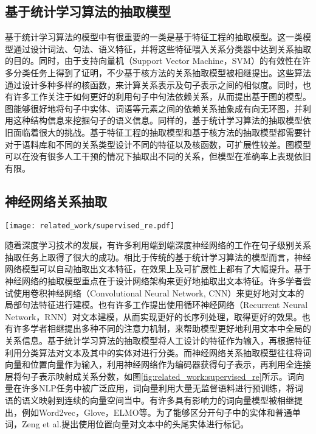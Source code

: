 \subsection{基于统计学习算法的抽取模型}
基于统计学习算法的模型中有很重要的一类是基于特征工程的抽取模型。这一类模型通过设计词法、句法、语义特征，并将这些特征喂入关系分类器中达到关系抽取的目的\cite{kambhatla2004combining,guodong2005exploring,jiang2007systematic}。同时，由于支持向量机（Support Vector Machine，SVM）的有效性在许多分类任务上得到了证明，不少基于核方法的关系抽取模型被相继提出\cite{culotta2004dependency,bunescu2005shortest,zhang2006composite}。这些算法通过设计多种多样的核函数，来计算关系表示及句子表示之间的相似度。同时，也有许多工作关注于如何更好的利用句子中句法依赖关系，从而提出基于图的模型\cite{roth2002probabilistic,sarawagi2005semi,yu2010jointly}。图能够很好地将句子中实体、词语等元素之间的依赖关系抽象成有向无环图，并利用这种结构信息来挖掘句子的语义信息。同样的，基于统计学习算法的抽取模型依旧面临着很大的挑战。基于特征工程的抽取模型和基于核方法的抽取模型都需要针对于语料库和不同的关系类型设计不同的特征以及核函数，可扩展性较差。图模型可以在没有很多人工干预的情况下抽取出不同的关系，但模型在准确率上表现依旧有限。


\subsection{神经网络关系抽取}
\begin{figure*}
	\centering
	\texttt{[image: related\_work/supervised\_re.pdf]}
	\caption{神经网络关系抽取模型框架}
	\label{fig:related_work:supervised_re}
\end{figure*}

随着深度学习技术的发展，有许多利用端到端深度神经网络的工作在句子级别关系抽取任务上取得了很大的成功。相比于传统的基于统计学习算法的模型而言，神经网络模型可以自动抽取出文本特征，在效果上及可扩展性上都有了大幅提升。基于神经网络的抽取模型重点在于设计网络架构来更好地抽取出文本特征。许多学者尝试使用卷积神经网络（Convolutional Neural Network, CNN）来更好地对文本的局部句法特征进行建模\cite{liu2013convolution,zeng2014relation,nguyen2015relation}。也有许多工作\cite{zhang2015bidirectional,vu2016combining}提出使用循环神经网络（Recurrent Neural Network，RNN）对文本建模，从而实现更好的长序列处理，取得更好的效果。也有许多学者相继提出多种不同的注意力机制，来帮助模型更好地利用文本中全局的关系信息\cite{zhou2016attention,wang2016relation,xiao2016semantic}。基于统计学习算法的抽取模型将人工设计的特征作为输入，再根据特征利用分类算法对文本及其中的实体对进行分类。而神经网络关系抽取模型往往将词向量和位置向量作为输入，利用神经网络作为编码器获得句子表示，再利用全连接层将句子表示映射成关系分数，如图\ref{fig:related_work:supervised_re}所示。词向量在许多NLP任务中被广泛应用，词向量利用大量无监督语料进行预训练，将词语的语义映射到连续的向量空间当中。有许多具有影响力的词向量模型被相继提出，例如Word2vec\cite{mikolov2013distributed}，Glove\cite{pennington2014glove}，ELMO\cite{peters2018deep}等。为了能够区分开句子中的实体和普通单词，Zeng et al.\cite{zeng2014relation}提出使用位置向量对文本中的头尾实体进行标记。

